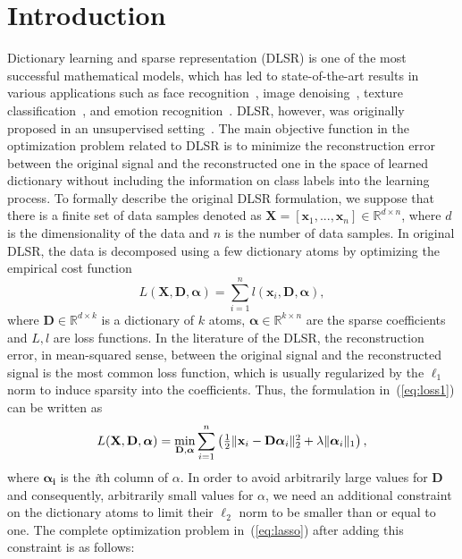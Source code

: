 \documentclass{llncs}
\begin{document}
\section{Introduction}
\label{sec:intro}

Dictionary learning and sparse representation (DLSR) is one of the most successful mathematical models, which has led to state-of-the-art results in various applications such as face recognition~\cite{DL:Zhong07,DL:Wright09,DL:MengYang11}, image denoising~\cite{DL:Mairal08}, texture classification~\cite{Gangeh:ICIAR11}, and emotion recognition~\cite{Gangeh:TASLP14}. DLSR, however, was originally proposed in an unsupervised setting~\cite{book:Elad}. The main objective function in the optimization problem related to DLSR is to minimize the reconstruction error between the original signal and the reconstructed one in the space of learned dictionary without including the information on class labels into the learning process. To formally describe the original DLSR formulation, we suppose that there is a finite set of data samples denoted as $\mathbf{X}=[\mathbf{x}_1,...,\mathbf{x}_n]\in\mathbb{R}^{d\times n}$, where $d$ is the dimensionality of the data and $n$ is the number of data samples. In original DLSR, the data is decomposed using a few dictionary atoms by optimizing the empirical cost function
\begin{equation}\label{eq:loss1}
L(\mathbf{X},\mathbf{D},\bm{\alpha})=\sum_{i=1}^{n}l(\mathbf{x}_i,\mathbf{D},\bm{\alpha}),
\end{equation}
where $\mathbf{D}\in\mathbb{R}^{d\times k}$ is a dictionary of $k$ atoms, $\bm{\alpha}\in\mathbb{R}^{k\times n}$ are the sparse coefficients and $L, l$ are loss functions. In the literature of the DLSR, the reconstruction error, in mean-squared sense, between the original signal and the reconstructed signal is the most common loss function, which is usually regularized by the $\ell_1$ norm to induce sparsity into the coefficients. Thus, the formulation in~(\ref{eq:loss1}) can be written as
\begin{equation}\label{eq:lasso}
L(\mathbf{X},\mathbf{D},\bm{\alpha})=\min_{\mathbf{D},\bm{\alpha}}\sum_{i=1}^{n}\begin{pmatrix}\frac{1}{2}\|\mathbf{x}_i-\mathbf{D}\bm{\alpha}_i\|_{\textup{2}}^{2}+\lambda\|\bm{\alpha}_i\|_{1}\end{pmatrix},
\end{equation}
where $\bm{\alpha_i}$ is the \emph{i}th column of $\alpha$. In order to avoid arbitrarily large values for $\mathbf{D}$ and consequently, arbitrarily small values for $\alpha$, we need an additional constraint on the dictionary atoms to limit their $\ell_2$ norm to be smaller than or equal to one. The complete optimization problem in~(\ref{eq:lasso}) after adding this constraint is as follows:
\end{document}
